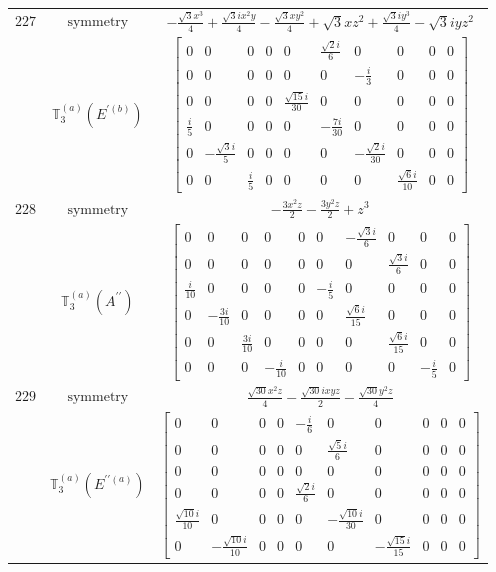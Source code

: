 \documentclass[fleqn,8pt,landscape]{jsarticle}
\begin{document}
\begin{longtable}{ccc}
$ 227 $ & $ \text{symmetry} $ & $ - \frac{\sqrt{3} x^{3}}{4} + \frac{\sqrt{3} i x^{2} y}{4} - \frac{\sqrt{3} x y^{2}}{4} + \sqrt{3} x z^{2} + \frac{\sqrt{3} i y^{3}}{4} - \sqrt{3} i y z^{2} $ \\
$  $ & $ \mathbb{T}_{3}^{(a)}(E^{\prime(b)}) $ & $ \begin{bmatrix} 0 & 0 & 0 & 0 & 0 & \frac{\sqrt{2} i}{6} & 0 & 0 & 0 & 0 \\ 0 & 0 & 0 & 0 & 0 & 0 & - \frac{i}{3} & 0 & 0 & 0 \\ 0 & 0 & 0 & 0 & \frac{\sqrt{15} i}{30} & 0 & 0 & 0 & 0 & 0 \\ \frac{i}{5} & 0 & 0 & 0 & 0 & - \frac{7 i}{30} & 0 & 0 & 0 & 0 \\ 0 & - \frac{\sqrt{3} i}{5} & 0 & 0 & 0 & 0 & - \frac{\sqrt{2} i}{30} & 0 & 0 & 0 \\ 0 & 0 & \frac{i}{5} & 0 & 0 & 0 & 0 & \frac{\sqrt{6} i}{10} & 0 & 0 \end{bmatrix} $ \\ \hline
$ 228 $ & $ \text{symmetry} $ & $ - \frac{3 x^{2} z}{2} - \frac{3 y^{2} z}{2} + z^{3} $ \\
$  $ & $ \mathbb{T}_{3}^{(a)}(A^{\prime\prime}) $ & $ \begin{bmatrix} 0 & 0 & 0 & 0 & 0 & 0 & - \frac{\sqrt{3} i}{6} & 0 & 0 & 0 \\ 0 & 0 & 0 & 0 & 0 & 0 & 0 & \frac{\sqrt{3} i}{6} & 0 & 0 \\ \frac{i}{10} & 0 & 0 & 0 & 0 & - \frac{i}{5} & 0 & 0 & 0 & 0 \\ 0 & - \frac{3 i}{10} & 0 & 0 & 0 & 0 & \frac{\sqrt{6} i}{15} & 0 & 0 & 0 \\ 0 & 0 & \frac{3 i}{10} & 0 & 0 & 0 & 0 & \frac{\sqrt{6} i}{15} & 0 & 0 \\ 0 & 0 & 0 & - \frac{i}{10} & 0 & 0 & 0 & 0 & - \frac{i}{5} & 0 \end{bmatrix} $ \\ \hline
$ 229 $ & $ \text{symmetry} $ & $ \frac{\sqrt{30} x^{2} z}{4} - \frac{\sqrt{30} i x y z}{2} - \frac{\sqrt{30} y^{2} z}{4} $ \\
$  $ & $ \mathbb{T}_{3}^{(a)}(E^{\prime\prime(a)}) $ & $ \begin{bmatrix} 0 & 0 & 0 & 0 & - \frac{i}{6} & 0 & 0 & 0 & 0 & 0 \\ 0 & 0 & 0 & 0 & 0 & \frac{\sqrt{5} i}{6} & 0 & 0 & 0 & 0 \\ 0 & 0 & 0 & 0 & 0 & 0 & 0 & 0 & 0 & 0 \\ 0 & 0 & 0 & 0 & \frac{\sqrt{2} i}{6} & 0 & 0 & 0 & 0 & 0 \\ \frac{\sqrt{10} i}{10} & 0 & 0 & 0 & 0 & - \frac{\sqrt{10} i}{30} & 0 & 0 & 0 & 0 \\ 0 & - \frac{\sqrt{10} i}{10} & 0 & 0 & 0 & 0 & - \frac{\sqrt{15} i}{15} & 0 & 0 & 0 \end{bmatrix} $ \\ \hline

\end{longtable}
\end{document}
